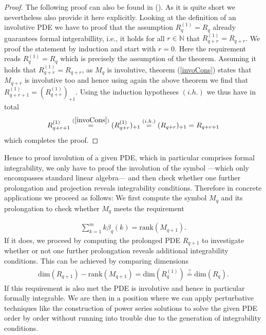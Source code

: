\begin{proof}
The following proof can also be found in (\cite{seiler1994analysis}). As it is quite short we nevertheless also provide it here explicitly.
Looking at the definition of an involutive PDE we have to proof that the assumption $R_q^{(1)} = R_q$ already guarantees formal intgerabillity, i.e., it holds for all $r \in \mathbb{N}$ that $R_{q+r}^(1) = R_{q+r}$. We proof the statement by induction and start with $r=0$. Here the requirement reads $R_q^{(1)}=R_q$ which is precisely the assumption of the theorem. Assuming it holds that $R_{q+r}^{(1)}=R_{q+r}$, as $M_q$ is involutive, theorem (\ref{invoCons}) states that $M_{q+r}$ is involutive too and hence using again the above theorem we find that $R_{q+r+1}^{(1)}= (R_{q+r}^{(1)})_{+1}$. Using the induction hypotheses $(i.h.)$ we thus have in total
\begin{align}
   R_{q+r+1}^{(1)} \overset{(\ref{invoCons})}{=} (R_{q+r}^{(1)})_{+1} \overset{(i.h.)}{=} (R_{q+r})_{+1} = R_{q+r+1} 
\end{align}
which completes the proof. 
\end{proof}
Hence to proof involution of a given PDE, which in  particular comprises formal integrability, we only have to proof the involution of the symbol ---which only encompasses standard linear algebra--- and then check whether one further prolongation and projection reveals integrability conditions. Therefore in concrete applications we proceed as follows: We first compute the symbol $M_q$ and its prolongation to check whether $M_q$ meets the requirement 

\begin{align}
        \sum_{k=1}^m k\beta_q(k) = \mathrm{rank}(M_{q+1}).
\end{align}
If it does, we proceed by computing the prolonged PDE $R_{q+1}$ to investigate whether or not one further prolongation reveals additional integrability conditions. This can be achieved by comparing dimensions
\begin{align}
    \mathrm{dim}(R_{q+1}) - \mathrm{rank}(M_{q+1}) = \mathrm{dim}(R_q^{(1)}) \stackrel{?}{=} \mathrm{dim}(R_q).
\end{align}
If this requirement is also met the PDE is involutive and hence in particular formally integrable. We are then in a position where we can apply perturbative techniques like the construction of power series solutions to solve the given PDE order by order without running into trouble due to the generation of integrability conditions.


